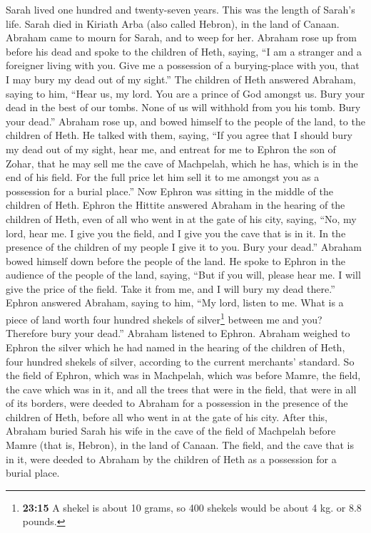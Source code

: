  Sarah lived one hundred and twenty-seven years. This was
the length of Sarah's life.  Sarah died in Kiriath Arba
(also called Hebron), in the land of Canaan. Abraham came to mourn for
Sarah, and to weep for her.  Abraham rose up from before
his dead and spoke to the children of Heth, saying,  ``I
am a stranger and a foreigner living with you. Give me a possession of a
burying-place with you, that I may bury my dead out of my sight.''
 The children of Heth answered Abraham, saying to him,
 ``Hear us, my lord. You are a prince of God amongst us.
Bury your dead in the best of our tombs. None of us will withhold from
you his tomb. Bury your dead.''  Abraham rose up, and
bowed himself to the people of the land, to the children of Heth.
 He talked with them, saying, ``If you agree that I should
bury my dead out of my sight, hear me, and entreat for me to Ephron the
son of Zohar,  that he may sell me the cave of Machpelah,
which he has, which is in the end of his field. For the full price let
him sell it to me amongst you as a possession for a burial place.''
 Now Ephron was sitting in the middle of the children of
Heth. Ephron the Hittite answered Abraham in the hearing of the children
of Heth, even of all who went in at the gate of his city, saying,
 ``No, my lord, hear me. I give you the field, and I give
you the cave that is in it. In the presence of the children of my people
I give it to you. Bury your dead.''  Abraham bowed
himself down before the people of the land.  He spoke to
Ephron in the audience of the people of the land, saying, ``But if you
will, please hear me. I will give the price of the field. Take it from
me, and I will bury my dead there.''  Ephron answered
Abraham, saying to him,  ``My lord, listen to me. What is
a piece of land worth four hundred shekels of silver\footnote{\textbf{23:15}
  A shekel is about 10 grams, so 400 shekels would be about 4 kg. or 8.8
  pounds.} between me and you? Therefore bury your dead.''
 Abraham listened to Ephron. Abraham weighed to Ephron
the silver which he had named in the hearing of the children of Heth,
four hundred shekels of silver, according to the current merchants'
standard.  So the field of Ephron, which was in
Machpelah, which was before Mamre, the field, the cave which was in it,
and all the trees that were in the field, that were in all of its
borders, were deeded  to Abraham for a possession in the
presence of the children of Heth, before all who went in at the gate of
his city.  After this, Abraham buried Sarah his wife in
the cave of the field of Machpelah before Mamre (that is, Hebron), in
the land of Canaan.  The field, and the cave that is in
it, were deeded to Abraham by the children of Heth as a possession for a
burial place.

